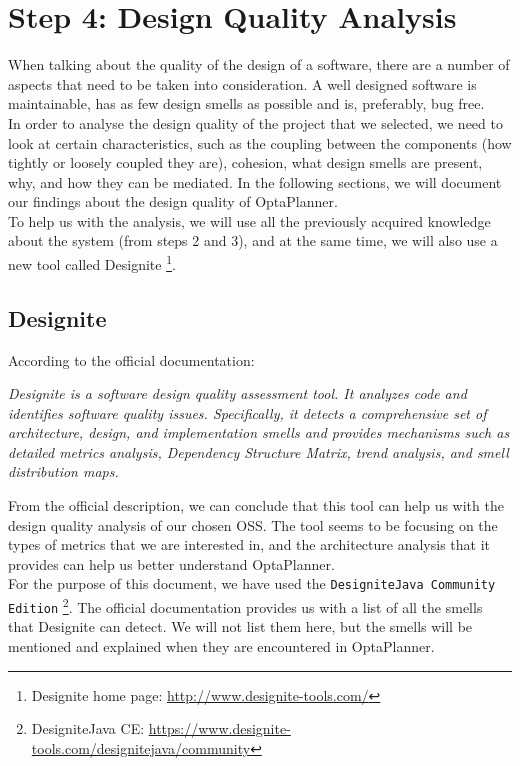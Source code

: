 \clearpage
\section{Step 4: Design Quality Analysis}
    When talking about the quality of the design of a software, there are a number of aspects that need to be taken into consideration. A well designed software is maintainable, has as few design smells as possible and is, preferably, bug free.\\
    In order to analyse the design quality of the project that we selected, we need to look at certain characteristics, such as the coupling between the components (how tightly or loosely coupled they are), cohesion, what design smells are present, why, and how they can be mediated. In the following sections, we will document our findings about the design quality of OptaPlanner.\\
    To help us with the analysis, we will use all the previously acquired knowledge about the system (from steps 2 and 3), and at the same time, we will also use a new tool called Designite 
    \footnote{Designite home page: \url{http://www.designite-tools.com/}}.
    
    \subsection{Designite}
        According to the official documentation:\\
        \begin{adjustwidth}{1.5cm}{}
            \textit{Designite is a software design quality assessment tool. It analyzes code
            and identifies software quality issues. Specifically, it detects a comprehensive set 
            of architecture, design, and implementation smells and provides mechanisms such as detailed metrics analysis, 
            Dependency Structure Matrix, trend analysis, and smell distribution maps.}
        \end{adjustwidth}
        \vspace{0.5cm}
        From the official description, we can conclude that this tool can help us with the design quality analysis of our chosen OSS. The tool seems to be focusing on the types of metrics that we are interested in, and the architecture analysis that it provides can help us better understand OptaPlanner. \\
        For the purpose of this document, we have used the \texttt{DesigniteJava Community Edition} 
        \footnote{DesigniteJava CE: \url{https://www.designite-tools.com/designitejava/community}}.
        The official documentation provides us with a list of all the smells that Designite can detect. We will not list them here, but the smells will be mentioned and explained when they are encountered in OptaPlanner.\\
        
